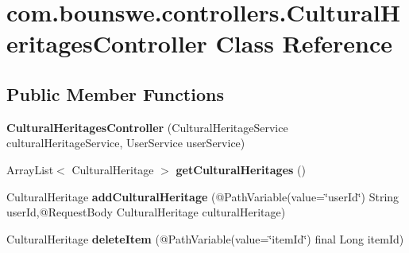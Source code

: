 \hypertarget{classcom_1_1bounswe_1_1controllers_1_1CulturalHeritagesController}{}\section{com.\+bounswe.\+controllers.\+Cultural\+Heritages\+Controller Class Reference}
\label{classcom_1_1bounswe_1_1controllers_1_1CulturalHeritagesController}
\subsection*{Public Member Functions}
\begin{DoxyCompactItemize}
\item 
\hypertarget{classcom_1_1bounswe_1_1controllers_1_1CulturalHeritagesController_a6194a7de4bb7a1a331fc8cabfd022d33}{}{\bfseries Cultural\+Heritages\+Controller} (Cultural\+Heritage\+Service cultural\+Heritage\+Service, User\+Service user\+Service)\label{classcom_1_1bounswe_1_1controllers_1_1CulturalHeritagesController_a6194a7de4bb7a1a331fc8cabfd022d33}

\item 
\hypertarget{classcom_1_1bounswe_1_1controllers_1_1CulturalHeritagesController_a93a08a5718c76206db576488c1c00829}{}Array\+List$<$ Cultural\+Heritage $>$ {\bfseries get\+Cultural\+Heritages} ()\label{classcom_1_1bounswe_1_1controllers_1_1CulturalHeritagesController_a93a08a5718c76206db576488c1c00829}

\item 
\hypertarget{classcom_1_1bounswe_1_1controllers_1_1CulturalHeritagesController_a88f0bf74584b52635884290d08c832ad}{}Cultural\+Heritage {\bfseries add\+Cultural\+Heritage} (@Path\+Variable(value=\char`\"{}user\+Id\char`\"{}) String user\+Id,@Request\+Body Cultural\+Heritage cultural\+Heritage)\label{classcom_1_1bounswe_1_1controllers_1_1CulturalHeritagesController_a88f0bf74584b52635884290d08c832ad}

\item 
\hypertarget{classcom_1_1bounswe_1_1controllers_1_1CulturalHeritagesController_a6d23f337f8b4cb0292ce81d960083d61}{}Cultural\+Heritage {\bfseries delete\+Item} (@Path\+Variable(value=\char`\"{}item\+Id\char`\"{}) final Long item\+Id)\label{classcom_1_1bounswe_1_1controllers_1_1CulturalHeritagesController_a6d23f337f8b4cb0292ce81d960083d61}


\end{DoxyCompactItemize}
